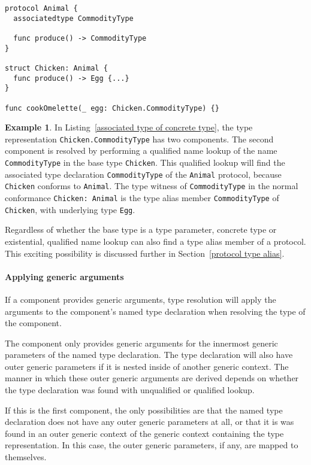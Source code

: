 \documentclass[a4paper,headsepline,bibliography=totoc,toc=flat,fleqn,twoside=semi]{scrbook}
\theoremstyle{definition}
\theoremstyle{definition}
\newtheorem{example}{Example}[chapter]
\theoremstyle{definition}
\begin{document}
\begin{listing}\label{associated type of concrete type}
\begin{Verbatim}
protocol Animal {
  associatedtype CommodityType

  func produce() -> CommodityType
}

struct Chicken: Animal {
  func produce() -> Egg {...}
}

func cookOmelette(_ egg: Chicken.CommodityType) {}
\end{Verbatim}
\end{listing}
\begin{example} In Listing~\ref{associated type of concrete type}, the type representation \texttt{Chicken.CommodityType} has two components. The second component is resolved by performing a qualified name lookup of the name \texttt{CommodityType} in the base type \texttt{Chicken}. This qualified lookup will find the associated type declaration \texttt{CommodityType} of the \texttt{Animal} protocol, because \texttt{Chicken} conforms to \texttt{Animal}. The type witness of \texttt{CommodityType} in the normal conformance \texttt{Chicken:\ Animal} is the type alias member \texttt{CommodityType} of \texttt{Chicken}, with underlying type \texttt{Egg}.
\end{example}

Regardless of whether the base type is a type parameter, concrete type or existential, qualified name lookup can also find a type alias member of a protocol. This exciting possibility is discussed further in Section~\ref{protocol type alias}.

\paragraph{Applying generic arguments} If a component provides generic arguments, type resolution will apply the arguments to the component's named type declaration when resolving the type of the component.

The component only provides generic arguments for the innermost generic parameters of the named type declaration. The type declaration will also have outer generic parameters if it is nested inside of another generic context. The manner in which these outer generic arguments are derived depends on whether the type declaration was found with unqualified or qualified lookup.

If this is the first component, the only possibilities are that the named type declaration does not have any outer generic parameters at all, or that it is was found in an outer generic context of the generic context containing the type representation. In this case, the outer generic parameters, if any, are mapped to themselves.
\end{document}
